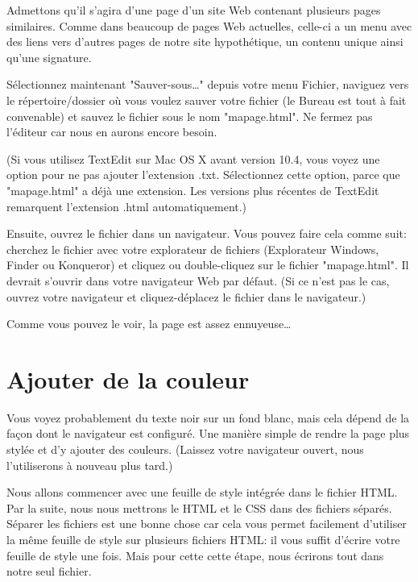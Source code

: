 Admettons qu'il s'agira d'une page d'un site Web contenant plusieurs pages similaires. Comme dans beaucoup de pages Web actuelles, celle-ci a un menu avec des liens vers d'autres pages de notre site hypothétique, un contenu unique ainsi qu'une signature.

Sélectionnez maintenant "Sauver-sous…" depuis votre menu Fichier, naviguez vers le répertoire/dossier où vous voulez sauver votre fichier (le Bureau est tout à fait convenable) et sauvez le fichier sous le nom "mapage.html". Ne fermez pas l'éditeur car nous en aurons encore besoin.

(Si vous utilisez TextEdit sur Mac OS X avant version 10.4, vous voyez une option pour ne pas ajouter l'extension .txt. Sélectionnez cette option, parce que "mapage.html" a déjà une extension. Les versions plus récentes de TextEdit remarquent l'extension .html automatiquement.)

Ensuite, ouvrez le fichier dans un navigateur. Vous pouvez faire cela comme suit: cherchez le fichier avec votre explorateur de fichiers (Explorateur Windows, Finder ou Konqueror) et cliquez ou double-cliquez sur le fichier "mapage.html". Il devrait s'ouvrir dans votre navigateur Web par défaut. (Si ce n'est pas le cas, ouvrez votre navigateur et cliquez-déplacez le fichier dans le navigateur.)

Comme vous pouvez le voir, la page est assez ennuyeuse… 
\section{Ajouter de la couleur}
Vous voyez probablement du texte noir sur un fond blanc, mais cela dépend de la façon dont le navigateur est configuré. Une manière simple de rendre la page plus stylée et d'y ajouter des couleurs. (Laissez votre navigateur ouvert, nous l'utiliserons à nouveau plus tard.)

Nous allons commencer avec une feuille de style intégrée dans le fichier HTML. Par la suite, nous nous mettrons le HTML et le CSS dans des fichiers séparés. Séparer les fichiers est une bonne chose car cela vous permet facilement d'utiliser la même feuille de style sur plusieurs fichiers HTML: il vous suffit d'écrire votre feuille de style une fois. Mais pour cette cette étape, nous écrirons tout dans notre seul fichier.

